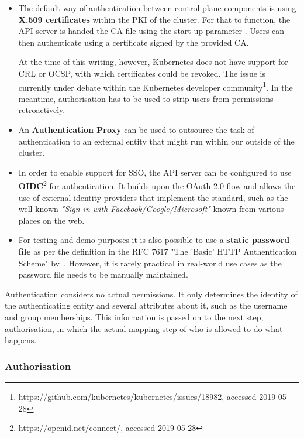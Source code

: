 \begin{itemize}
    \item The default way of authentication between control plane components is using \textbf{X.509 certificates} within the \ac{PKI} of the cluster. For that to function, the API server is handed the \ac{CA} file using the start-up parameter . Users can then authenticate using a certificate signed by the provided CA. 
    
    At the time of this writing, however, Kubernetes does not have support for \ac{CRL} or \ac{OCSP}, with which certificates could be revoked. The issue is currently under debate within the Kubernetes developer community\footnote{\url{https://github.com/kubernetes/kubernetes/issues/18982}, accessed 2019-05-28}. In the meantime, authorisation has to be used to strip users from permissions retroactively.

    \item An \textbf{Authentication Proxy} can be used to outsource the task of authentication to an external entity that might run within our outside of the cluster.
    
    \item In order to enable support for \ac{SSO}, the API server can be configured to use \textbf{\ac{OIDC}}\footnote{\url{https://openid.net/connect/}, accessed 2019-05-28} for authentication. It builds upon the OAuth 2.0 flow and allows the use of external identity providers that implement the standard, such as the well-known \textit{"Sign in with Facebook/Google/Microsoft"} known from various places on the web. 

   \item For testing and demo purposes it is also possible to use a \textbf{static password file} as per the definition in the RFC 7617 "The 'Basic' HTTP Authentication Scheme" by~\textcite{RFC7617}. However, it is rarely practical in real-world use cases as the password file needs to be manually maintained.
	
\end{itemize}

Authentication considers no actual permissions. It only determines the identity of the authenticating entity and several attributes about it, such as the username and group memberships. This information is passed on to the next step, authorisation, in which the actual mapping step of who is allowed to do what happens. 

\subsubsection{Authorisation} \label{authorisation}

